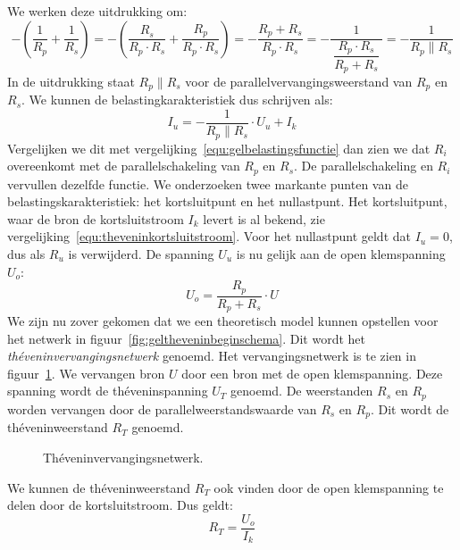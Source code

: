 %
We werken deze uitdrukking om:
%
\begin{equation}
- \left(\dfrac{1}{R_p}+\dfrac{1}{R_s}\right) = - \left(\dfrac{R_s}{R_p\cdot R_s}+\dfrac{R_p}{R_p\cdot R_s}\right) =
-\dfrac{R_p+R_s}{R_p\cdot R_s} = - \dfrac{1}{\ \dfrac{R_p\cdot R_s}{R_p+R_s}\ } = -\dfrac{1}{R_p \parallel R_s}
\end{equation}
%
In de uitdrukking staat $R_p \parallel R_s$ voor de parallelvervangingsweerstand van $R_p$ en $R_s$. We kunnen de
belastingkarakteristiek dus schrijven als:
%
\begin{equation}
I_u = -\dfrac{1}{R_p\parallel R_s}\cdot U_u + I_k
\end{equation}
%
Vergelijken we dit met vergelijking~\eqref{equ:gelbelastingsfunctie} dan zien we dat $R_i$ overeenkomt
met de parallelschakeling van $R_p$ en $R_s$. De parallelschakeling en $R_i$ vervullen dezelfde functie.
We onderzoeken twee markante punten van de belastingskarakteristiek: het kortsluitpunt en het nullastpunt.
Het kortsluitpunt, waar de bron de kortsluitstroom $I_k$ levert is al bekend, zie
vergelijking~\eqref{equ:theveninkortsluitstroom}. Voor het nullastpunt geldt dat $I_u = 0$, dus als $R_u$
is verwijderd. De spanning $U_u$ is nu gelijk aan de open klemspanning $U_o$:
%
\begin{equation}
U_o = \dfrac{R_p}{R_p+R_s}\cdot U
\end{equation}
%
We zijn nu zover gekomen dat we een theoretisch model kunnen opstellen voor het netwerk in
figuur~\ref{fig:geltheveninbeginschema}. Dit wordt het \textsl{th\'eveninvervangingsnetwerk} genoemd. Het
vervangingsnetwerk is
te zien in figuur~\ref{fig:geltheveninvervangingsschema}. We vervangen bron $U$ door een bron met de open
klemspanning. Deze spanning wordt de th\'eveninspanning $U_T$ genoemd. De weerstanden $R_s$ en $R_p$ worden
vervangen door de parallelweerstandswaarde van $R_s$ en $R_p$. Dit wordt de th\'eveninweerstand $R_T$
genoemd.

\begin{figure}[!ht]
\centering
{}
\captionsetup{width=.9\linewidth}
\caption{Th\'eveninvervangingsnetwerk.}
\label{fig:geltheveninvervangingsschema}
\end{figure}

We kunnen de th\'eveninweerstand $R_T$ ook vinden door de open klemspanning te delen door de kortsluitstroom.
Dus geldt:
%
\begin{equation}
R_T = \dfrac{U_o}{I_k}
\end{equation}

